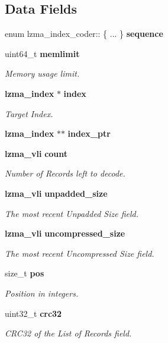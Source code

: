 \subsection*{Data Fields}
\begin{DoxyCompactItemize}
\item 
\mbox{\label{structlzma__index__coder_ad20bf31e12cef53f9cb7d0023208ba30}} 
enum lzma\+\_\+index\+\_\+coder\+:: \{ ... \}  {\bfseries sequence}
\item 
uint64\+\_\+t \textbf{ memlimit}
\begin{DoxyCompactList}\small\item\em Memory usage limit. \end{DoxyCompactList}\item 
\textbf{ lzma\+\_\+index} $\ast$ \textbf{ index}
\begin{DoxyCompactList}\small\item\em Target Index. \end{DoxyCompactList}\item 
\textbf{ lzma\+\_\+index} $\ast$$\ast$ \textbf{ index\+\_\+ptr}
\item 
\textbf{ lzma\+\_\+vli} \textbf{ count}
\begin{DoxyCompactList}\small\item\em Number of Records left to decode. \end{DoxyCompactList}\item 
\textbf{ lzma\+\_\+vli} \textbf{ unpadded\+\_\+size}
\begin{DoxyCompactList}\small\item\em The most recent Unpadded Size field. \end{DoxyCompactList}\item 
\textbf{ lzma\+\_\+vli} \textbf{ uncompressed\+\_\+size}
\begin{DoxyCompactList}\small\item\em The most recent Uncompressed Size field. \end{DoxyCompactList}\item 
size\+\_\+t \textbf{ pos}
\begin{DoxyCompactList}\small\item\em Position in integers. \end{DoxyCompactList}\item 
uint32\+\_\+t \textbf{ crc32}
\begin{DoxyCompactList}\small\item\em C\+R\+C32 of the List of Records field. \end{DoxyCompactList}\item 
$$
\end{DoxyCompactItemize}

